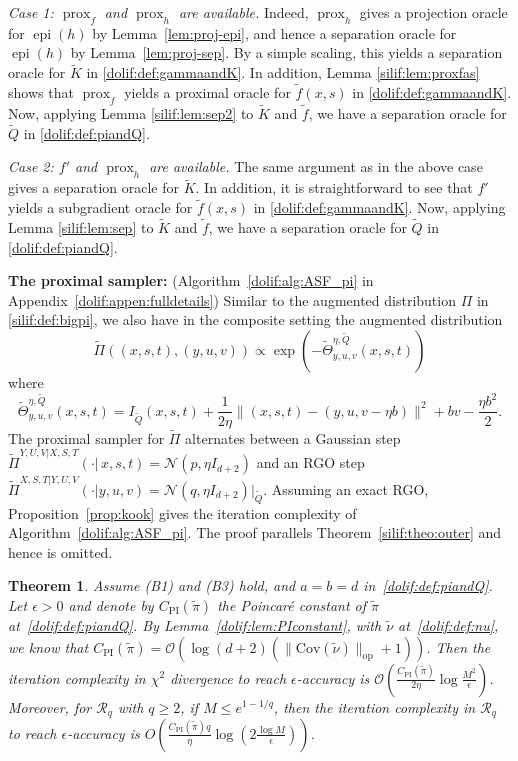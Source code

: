 \documentclass[11pt,letterpaper]{article}
\newcommand{\K}{\widetilde{K}}
\newcommand{\Q}{\widetilde{Q}}
\newcommand{\prox}{\operatorname{prox}}
\newcommand{\epi}{\operatorname{epi}}
\newcommand{\brac}[1]{\left( #1\right)}
\newtheorem{theorem}[thm]{Theorem}
\begin{document}
\textit{Case 1: $\prox_f$ and $\prox_h$ are available.} Indeed, $\prox_h$ gives a projection oracle for $\epi(h)$ by Lemma~\ref{lem:proj-epi}, and hence a separation oracle for $\epi(h)$ by Lemma~\ref{lem:proj-sep}. By a simple scaling, this yields a separation oracle for $\K$ in \eqref{dolif:def:gammaandK}. In addition, Lemma \ref{silif:lem:proxfas} shows that $\prox_f$ yields a proximal oracle for $\tilde f(x,s)$ in \eqref{dolif:def:gammaandK}.
     Now, applying Lemma \ref{silif:lem:sep2} to $\K$ and $\tilde f$, we have a separation oracle for $\Q$ in \eqref{dolif:def:piandQ}.

\textit{Case 2: $f'$ and $\prox_h$ are available.} The same argument as in the above case gives a separation oracle for $\K$. 
    In addition, it is straightforward to see that $f'$ yields a subgradient oracle for $\tilde f(x,s)$ in \eqref{dolif:def:gammaandK}.
    Now, applying Lemma \ref{silif:lem:sep} to $\K$ and $\tilde f$, we have a separation oracle for $\Q$ in \eqref{dolif:def:piandQ}.

\textbf{The proximal sampler:} (Algorithm~\ref{dolif:alg:ASF_pi} in Appendix~\ref{dolif:appen:fulldetails}) Similar to the augmented distribution $\Pi$ in \eqref{silif:def:bigpi}, we also have in the composite setting the augmented distribution
\begin{equation}
\label{dolif:def:Pi}
    \widetilde{\Pi}\brac{(x,s,t),(y,u,v)}\propto \exp\brac{ -\widetilde{\Theta}^{\eta,\Q}_{y,u,v}(x,s,t)}
\end{equation}
where
\begin{equation}
\label{dolif:def:Theta}
    \widetilde{\Theta}^{\eta,\Q}_{y,u,v}(x,s,t)=I_{\Q}(x,s,t)+\frac{1}{2\eta}\|(x,s,t)-(y,u,v-\eta b)\|^2
+bv-\frac{\eta b^2}{2}. 
\end{equation}
The proximal sampler for $\widetilde{\Pi}$ alternates between a Gaussian step $\widetilde{\Pi}^{Y,U,V|X,S,T}(\cdot|\,x,s,t)=\mathcal{N}(p,\eta I_{d+2})$ and an RGO step $ \widetilde{\Pi}^{X,S,T|Y,U,V}(\cdot|y,u,v)=\mathcal{N}(q,\eta I_{d+2})\big|_{\Q}$. Assuming an exact RGO, Proposition~\ref{prop:kook} gives the iteration complexity of Algorithm~\ref{dolif:alg:ASF_pi}. The proof parallels Theorem~\ref{silif:theo:outer} and hence is omitted. 

\begin{theorem}\label{dolif:theo:outer}
Assume (B1) and (B3) hold, and $a=b=d$ in~\eqref{dolif:def:piandQ}. Let $\epsilon>0$ and denote by $C_{\mathrm{PI}}(\tilde{\pi})$ the Poincar\'e constant of $\tilde{\pi}$ at~\eqref{dolif:def:piandQ}. By Lemma~\ref{dolif:lem:PIconstant}, with $\tilde{\nu}$ at~\eqref{dolif:def:nu}, we know that
$C_{\mathrm{PI}}(\tilde{\pi})=\mathcal{O} \left(\log(d+2)\left(\|\mathrm{Cov}(\tilde{\nu})\|_{\mathrm{op}}+1\right)\right)$.
Then the iteration complexity in $\chi^2$ divergence to reach $\epsilon$-accuracy is
$\mathcal{O} \left(\frac{C_{\mathrm{PI}}(\tilde{\pi})}{2\eta}\log \frac{M^2}{\epsilon}\right)$.
Moreover, for $\mathcal{R}_q$ with $q\ge2$, if $M\le e^{1-1/q}$, then the iteration complexity in $\mathcal{R}_q$ to reach $\epsilon$-accuracy is
$O \left(\frac{C_{\mathrm{PI}}(\tilde{\pi}) q}{\eta}\log \left(2\frac{\log M}{\epsilon}\right)\right)$.
\end{theorem}
\end{document}
